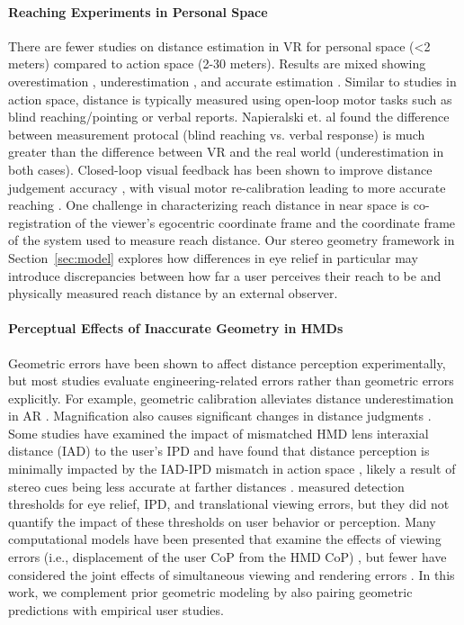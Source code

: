 \paragraph{Reaching Experiments in Personal Space}
There are fewer studies on distance estimation in VR for personal space (<2 meters) compared to action space (2-30 meters). Results are mixed showing overestimation \cite{rolland_towards_1995}, underestimation \cite{napieralski_near-field_2011}, and accurate estimation \cite{naceri_depth_2011}. Similar to studies in action space, distance is typically measured using open-loop motor tasks such as blind reaching/pointing or verbal reports. Napieralski et. al  found the difference between measurement protocal (blind reaching vs. verbal response) is much greater than the difference between VR and the real world (underestimation in both cases). Closed-loop visual feedback has been shown to improve distance judgement accuracy \cite{kelly_recalibration_2014, mohler_influence_2006, altenhoff_effects_2012}, with visual motor re-calibration leading to more accurate reaching \cite{ebrahimi_effects_2014, ebrahimi_carryover_2015}. One challenge in characterizing reach distance in near space is co-registration of the viewer's egocentric coordinate frame and the coordinate frame of the system used to measure reach distance. Our stereo geometry framework in Section~\ref{sec:model} explores how differences in eye relief in particular may introduce discrepancies between how far a user perceives their reach to be and physically measured reach distance by an external observer.

\paragraph{Perceptual Effects of Inaccurate Geometry in HMDs}
Geometric errors have been shown to affect distance perception experimentally, but most studies evaluate engineering-related errors rather than geometric errors explicitly. For example, geometric calibration alleviates distance underestimation in AR \cite{kellner_geometric_2012}. Magnification also causes significant changes in distance judgments \cite{kellner_geometric_2012, kuhl_hmd_2009, zhang_minification_2012, li_effects_2015}. Some studies have examined the impact of mismatched HMD lens interaxial distance (IAD) to the user's IPD and have found that distance perception is minimally impacted by the IAD-IPD mismatch in action space \cite{chakraborty_inter-pupillary_2024,willemsen_effects_2008, hibbard_implications_2020}, likely a result of stereo cues being less accurate at farther distances \cite{mccann_contributions_2018}.  measured detection thresholds for eye relief, IPD, and translational viewing errors, but they did not quantify the impact of these thresholds on user behavior or perception. Many computational models have been presented that examine the effects of viewing errors (i.e., displacement of the user CoP from the HMD CoP) \cite{woods93,held2008misperceptions,rolland04}, but fewer have considered the joint effects of simultaneous viewing and rendering errors \cite{holloway1997}. In this work, we complement prior geometric modeling by also pairing geometric predictions with empirical user studies.

